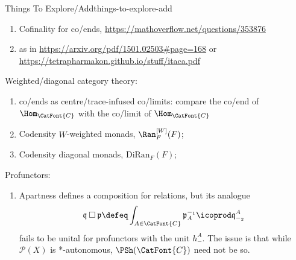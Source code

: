 \begin{remark}{Things To Explore/Add}{things-to-explore-add}
\begin{enumerate}
        \item Cofinality for co/ends, \url{https://mathoverflow.net/questions/353876}
        \item {} as in \url{https://arxiv.org/pdf/1501.02503#page=168} or \url{https://tetrapharmakon.github.io/stuff/itaca.pdf}
    \end{enumerate}
    Weighted/diagonal category theory:
    \begin{enumerate}
        \item co/ends as centre/trace-infused co/limits: compare the co/end of $\Hom_{\CatFont{C}}$ with the co/limit of $\Hom_{\CatFont{C}}$
        \item Codensity $W$-weighted monads, $\Ran^{[W]}_{F}(F)$;
        \item Codensity diagonal monads, $\mathrm{DiRan}_{F}(F)$;
    \end{enumerate}
    Profunctors:
    \begin{enumerate}
        \item Apartness defines a composition for relations, but its analogue
            \[
                \mathfrak{q}\mathbin{\square}\mathfrak{p}%
                \defeq%
                \int_{A\in\CatFont{C}}\mathfrak{p}^{-_{1}}_{A}\icoprod\mathfrak{q}^{A}_{-_{2}}%
            \]%
            fails to be unital for profunctors with the unit $h^{A}_{-}$. The issue is that while $\mathcal{P}(X)$ is *-autonomous, $\PSh(\CatFont{C})$ need not be so.


\end{enumerate}
\end{remark}
